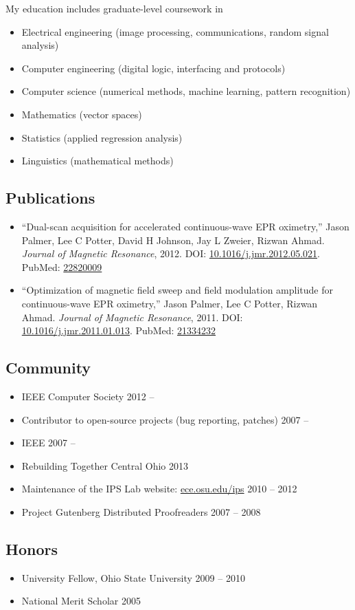 \documentclass[12pt]{report}
\begin{document}
My education includes graduate-level coursework in
\begin{itemize}
\item Electrical engineering (image processing, communications, random signal analysis)
\item Computer engineering (digital logic, interfacing and protocols)
\item Computer science (numerical methods, machine learning, pattern recognition)
\item Mathematics (vector spaces)
\item Statistics (applied regression analysis)
\item Linguistics (mathematical methods)
\end{itemize}

\subsection*{Publications}
\begin{itemize}
\item ``Dual-scan acquisition for accelerated continuous-wave EPR oximetry,''
Jason Palmer, Lee C Potter, David H Johnson, Jay L Zweier, Rizwan Ahmad.
{\it Journal of Magnetic Resonance}, 2012.
DOI: \href{http://dx.doi.org/10.1016/j.jmr.2012.05.021}{10.1016/j.jmr.2012.05.021}.
PubMed: \href{http://www.ncbi.nlm.nih.gov/pubmed/22820009}{22820009}
\item ``Optimization of magnetic field sweep and field modulation amplitude for continuous-wave EPR oximetry,''
Jason Palmer, Lee C Potter, Rizwan Ahmad.
{\it Journal of Magnetic Resonance}, 2011.
DOI: \href{http://dx.doi.org/10.1016/j.jmr.2011.01.013}{10.1016/j.jmr.2011.01.013}.
PubMed: \href{http://www.ncbi.nlm.nih.gov/pubmed/21334232}{21334232}
\end{itemize}

\subsection*{Community}
\begin{itemize}
\item IEEE Computer Society                                                              \hfill 2012 -- ~~~~~~~
\item Contributor to open-source projects (bug reporting, patches)                       \hfill 2007 -- ~~~~~~~
\item IEEE                                                                               \hfill 2007 -- ~~~~~~~
\item Rebuilding Together Central Ohio                                                   \hfill 2013
\item Maintenance of the IPS Lab website: \href{http://ece.osu.edu/ips}{ece.osu.edu/ips} \hfill 2010 -- 2012
\item Project Gutenberg Distributed Proofreaders                                         \hfill 2007 -- 2008
\end{itemize}

\subsection*{Honors}
\begin{itemize}
\item University Fellow, Ohio State University \hfill 2009 -- 2010
\item National Merit Scholar                   \hfill 2005
\end{itemize}
\end{document}
